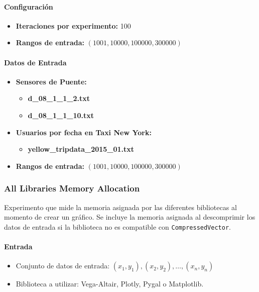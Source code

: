\paragraph{Configuración}

\begin{itemize}
    \item \textbf{Iteraciones por experimento:} 100
    \item \textbf{Rangos de entrada:} $(1001, 10000, 100000, 300000)$
\end{itemize}

\paragraph{Datos de Entrada}

\begin{itemize}
    \item \textbf{Sensores de Puente:}
    \begin{itemize}
        \item \textbf{d\_08\_1\_1\_2.txt} 
        \item \textbf{d\_08\_1\_1\_10.txt} 
    \end{itemize}
    \item \textbf{Usuarios por fecha en Taxi New York:}
    \begin{itemize}
        \item \textbf{yellow\_tripdata\_2015\_01.txt} 
    \end{itemize}
    \item \textbf{Rangos de entrada:} $(1001, 10000, 100000, 300000)$
\end{itemize}

\newpage

\subsubsection{All Libraries Memory Allocation}
\label{all_libraries_memory_allocation}

Experimento que mide la memoria asignada por las diferentes bibliotecas al momento de crear un gráfico. Se incluye la memoria asignada al descomprimir los datos de entrada si la biblioteca no es compatible con \texttt{CompressedVector}.

\paragraph{Entrada}
\begin{itemize}
    \item Conjunto de datos de entrada: \( (x_1, y_1), (x_2, y_2), \ldots, (x_n, y_n) \)
    \item Biblioteca a utilizar: Vega-Altair, Plotly, Pygal o Matplotlib.
\end{itemize}

